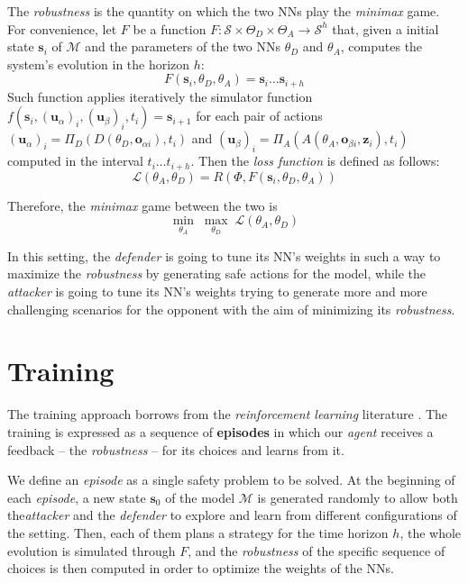The \textit{robustness} is the quantity on which the two NNs play the \textit{minimax} game.
For convenience, let $F$ be a function $F: \mathcal{S} \times \Theta_D \times \Theta_A \to \mathcal{S}^h$ that, given a initial state $\textbf{s}_i$ of $\mathcal{M}$ and the parameters of the two NNs $\theta_D$ and $\theta_A$, computes the system's evolution in the horizon $h$:
$$ F(\textbf{s}_i, \theta_D, \theta_A) = \textbf{s}_i \dots \textbf{s}_{i+h} $$
Such function applies iteratively the simulator function $f(\textbf{s}_i, (\textbf{u}_\alpha)_i, (\textbf{u}_\beta)_i, t_i) = \textbf{s}_{i+1}$ for each pair of actions $(\textbf{u}_\alpha)_i = \Pi_D(D(\theta_D, \textbf{o}_{\alpha i}),t_i)$ and $(\textbf{u}_\beta)_i = \Pi_A(A(\theta_A, \textbf{o}_{\beta i}, \textbf{z}_i), t_i)$ computed in the interval $t_i \dots t_{i+h}$.
Then the \textit{loss function} is defined as follows:
$$ \mathscr{L}(\theta_A, \theta_D) = R(\Phi, F(\textbf{s}_i, \theta_D, \theta_A)) $$

Therefore, the \textit{minimax} game between the two is$$ \underset{\theta_A}{\min} \; \underset{\theta_D}{\max} \; \mathscr{L}(\theta_A, \theta_D) $$

In this setting, the \textit{defender} is going to tune its NN's weights in such a way to maximize the \textit{robustness} by generating safe actions for the model, while the \textit{attacker} is going to tune its NN's weights trying to generate more and more challenging scenarios for the opponent with the aim of minimizing its \textit{robustness}.


\section{Training}
The training approach borrows from the \textit{reinforcement learning} literature \cite{reinforcementlearning}.
The training is expressed as a sequence of \textbf{episodes} in which our \textit{agent} receives a feedback -- the \textit{robustness} -- for its choices and learns from it.

We define an \textit{episode} as a single safety problem to be solved.
At the beginning of each \textit{episode}, a new state $\textbf{s}_0$ of the model $\mathcal{M}$ is generated randomly to allow both the\textit{attacker} and the \textit{defender} to explore and learn from different configurations of the setting.
Then, each of them plans a strategy for the time horizon $h$, the whole evolution is simulated through $F$, and the \textit{robustness} of the specific sequence of choices is then computed in order to optimize the weights of the NNs.


